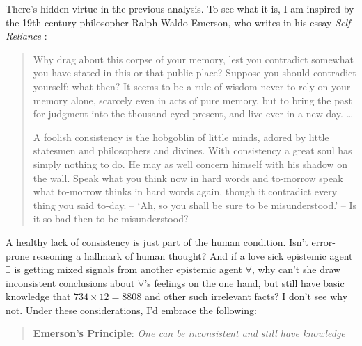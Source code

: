\documentclass[11pt]{article}
\numberwithin{equation}{subsection}
\begin{document}
There's hidden virtue in the previous analysis.  To see what it is, I am inspired by the 19th century philosopher Ralph Waldo Emerson, who writes in his essay \emph{Self-Reliance} \citep{emerson_essays_2008}:
\begin{quote}
{ Why drag about this corpse of your memory, lest you contradict somewhat you have stated in this or that public place? Suppose you should contradict yourself; what then? It seems to be a rule of wisdom never to rely on your memory alone, scarcely even in acts of pure memory, but to bring the past for judgment into the thousand-eyed present, and live ever in a new day. \ldots}

{A foolish consistency is the hobgoblin of little minds, adored by little statesmen and philosophers and divines. With consistency a great soul has simply nothing to do. He may as well concern himself with his shadow on the wall. Speak what you think now in hard words and to-morrow speak what to-morrow thinks in hard words again, 
though it contradict every thing you said to-day. 
-- `Ah, so you shall be sure to be misunderstood.' -- Is it so bad
then to be misunderstood? }
\end{quote}

A healthy lack of consistency is just part of the human condition.
Isn't error-prone reasoning a hallmark of human thought?  And if a
love sick epistemic agent $\exists$ is getting mixed signals from
another epistemic agent $\forall$, why can't she draw inconsistent
conclusions about $\forall$'s feelings on the one hand, but still have
basic knowledge that $734\times 12 = 8808$ and other such irrelevant
facts?  I don't see why not.  Under these considerations, I'd embrace
the following:
\begin{quote}
 \textbf{Emerson's Principle}: \emph{One can be inconsistent and still have knowledge}
\end{quote}
\end{document}
